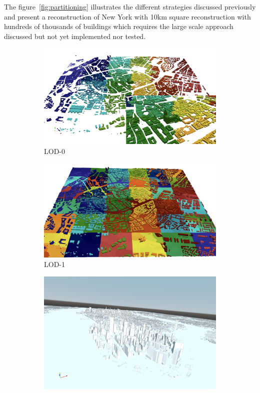 \documentclass[runningheads]{llncs}
\begin{document}
The figure~\ref{fig:partitioning} illustrates the different strategies discussed previously and present a reconstruction of New York with 10km square reconstruction with hundreds of thousands of buildings which requires the large scale approach discussed but not yet implemented nor tested.
\begin{figure}[htbp]
\centering
\begin{subfigure}{.4\textwidth}
  \centering
  \includegraphics[width=\linewidth]{images/city-strasbourg-lod0-parts.png}
  \caption{LOD-0}
  \label{fig:city-strasbourg-lod0-parts}
\end{subfigure}%
\begin{subfigure}{.4\textwidth}
  \centering
  \includegraphics[width=\linewidth]{images/city-strasbourg-lod1-parts.png}
  \caption{LOD-1}
  \label{fig:city-strasbourg-lod1-parts}
\end{subfigure}
\begin{subfigure}{.4\textwidth}
  \centering
  \includegraphics[width=\linewidth]{images/city-newyork-largescale.png}

\end{subfigure}
\end{figure}
\end{document}
